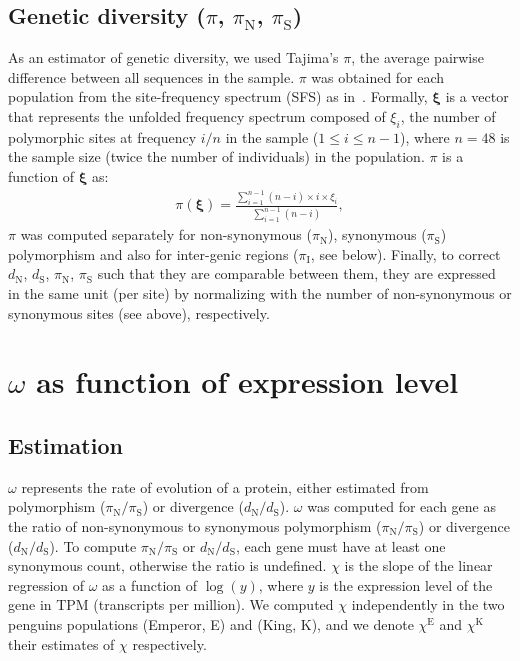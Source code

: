 \documentclass[10pt]{article}
\newcommand{\UniDimArray}[1]{\bm{#1}}
\newcommand{\dn}{d_{\text{N}}}
\newcommand{\ds}{d_{\text{S}}}
\newcommand{\dnds}{\dn / \ds}
\newcommand{\pin}{\pi_{\text{N}}}
\newcommand{\pis}{\pi_{\text{S}}}
\newcommand{\pinpis}{\pin / \pis}
\newcommand{\piInter}{\pi_{\text{I}}}
\begin{document}
    \subsection{Genetic diversity ($\pi$, $\pin$, $\pis$)}
    As an estimator of genetic diversity, we used Tajima's $\pi$, the average pairwise difference between all sequences in the sample.
    $\pi$ was obtained for each population from the site-frequency spectrum (SFS) as in~\textcite[eq.~5-6]{achaz_frequency_2009}.
    Formally, $\UniDimArray{\xi}$ is a vector that represents the unfolded frequency spectrum composed of $\xi_i$, the number of polymorphic sites at frequency $i/n$ in the sample ($1 \leq i \leq n - 1$), where $n=48$ is the sample size (twice the number of individuals) in the population.
    $\pi$ is a function of $\UniDimArray{\xi}$ as:
    \begin{align}
        \pi (\UniDimArray{\xi}) =  \frac{\sum_{i=1}^{n - 1} (n - i)\times i \times \xi_i}{\sum_{i=1}^{n - 1} (n - i)},
    \end{align}
    $\pi$ was computed separately for non-synonymous ($\pin$), synonymous ($\pis$) polymorphism and also for inter-genic regions ($\piInter$, see below).
    Finally, to correct $\dn$, $\ds$, $\pin$, $\pis$ such that they are comparable between them, they are expressed in the same unit (per site) by normalizing with the number of non-synonymous or synonymous sites (see above), respectively.


    \section{$\omega$ as function of expression level}

    \subsection{Estimation}
    $\omega$ represents the rate of evolution of a protein, either estimated from polymorphism ($\pinpis$) or divergence ($\dnds$).
    $\omega$ was computed for each gene as the ratio of non-synonymous to synonymous polymorphism ($\pinpis$) or divergence ($\dnds$).
    To compute $\pinpis$ or $\dnds$, each gene must have at least one synonymous count, otherwise the ratio is undefined.
    $\chi$ is the slope of the linear regression of $\omega$ as a function of $\log(y)$, where $y$ is the expression level of the gene in TPM (transcripts per million).
    We computed $\chi$ independently in the two penguins populations (Emperor, E) and (King, K), and we denote $\chi^{\text{E}}$ and $\chi^{\text{K}}$ their estimates of $\chi$ respectively.
\end{document}
